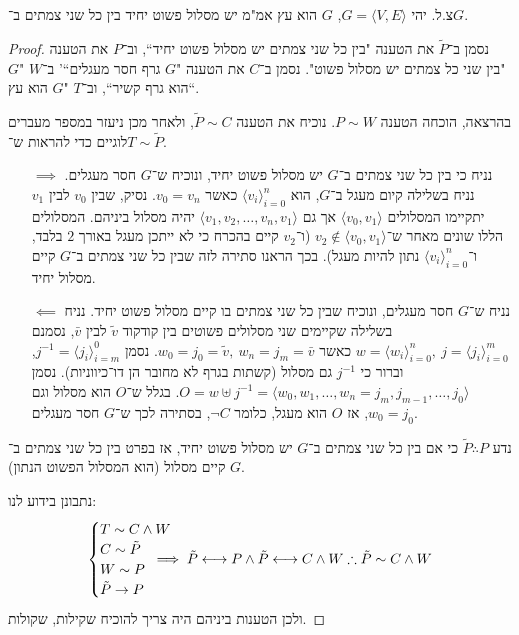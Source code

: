 \documentclass[]{article}
\newcommand\unquad {\!\!\!\!}
\newcommand\siff  {\longleftrightarrow}
\newcommand\ra    {\rangle}
\newcommand\la    {\langle}
\newcommand\tl    {\tilde}
\newcommand\op    {^{-1}}
\begin{document}
	\section{}
	צ.ל. יהי $G = \la V, E \ra$, $G$ הוא עץ אמ"מ יש מסלול פשוט יחיד בין כל שני צמתים ב־$G$. 
	\begin{proof}
		נסמן ב־$\tl P$ את הטענה "בין כל שני צמתים יש מסלול פשוט יחיד``, וב־$P$ את הטענה "בין שני כל צמתים יש מסלול פשוט". נסמן ב־$C$ את הטענה "$G$ גרף חסר מעגלים``' ב־$W$ "$G$ הוא גרף קשיר``, וב־$T$ "$G$ הוא עץ``. 
		
		בהרצאה, הוכחה הטענה $P \sim W$. נוכיח את הטענה $\tl P \sim C$, ולאחר מכן ניעזר במספר מעברים לוגיים כדי להראות ש־$T \sim \tl P$. 
		
		\begin{itemize}
			\item[$\implies$] נניח כי בין כל שני צמתים ב־$G$ יש מסלול פשוט יחיד, ונוכיח ש־$G$ חסר מעגלים. נניח בשלילה קיום מעגל ב־$G$, הוא $\la v_i \ra_{i = 0}^{n}$ כאשר $v_0 = v_n$. נסיק, שבין $v_0$ לבין $v_1$ יתקיימו המסלולים $\la v_0, v_1 \ra$ אך גם $\la v_1, v_2, \dots, v_n, v_1 \ra$ יהיה מסלול ביניהם. המסלולים הללו שונים מאחר ש־$v_2 \notin \la v_0, v_1 \ra$ (ו־$v_2$ קיים בהכרח כי לא ייתכן מעגל באורך $2$ בלבד, ו־$\la v_i \ra_{i = 0}^n$ נתון להיות מעגל). בכך הראנו סתירה לזה שבין כל שני צמתים ב־$G$ קיים מסלול יחיד. 
			\item[$\impliedby$] נניח ש־$G$ חסר מעגלים, ונוכיח שבין כל שני צמתים בו קיים מסלול פשוט יחיד. נניח בשלילה שקיימים שני מסלולים פשוטים בין קודקוד $\tl v$ לבין $\bar v$, נסמנם $w = \la w_i \ra_{i = 0}^n, \ j = \la j_i \ra_{i = 0}^m$ כאשר $w_0 = j_0 = \tl v, \ w_n = j_m = \bar v$. נסמן $j\op = \la j_i \ra_{i = m}^0$, וברור כי $j\op$ גם מסלול (קשתות בגרף לא מחובר הן דו־כיווניות). נסמן $O = w \uplus j\op = \la w_0, w_1, \dots, w_n = j_m, j_{m - 1}, \dots, j_0 \ra$. בגלל ש־$O$ הוא מסלול וגם $w_0 = j_0$, אז $O$ הוא מעגל, כלומר $\lnot C$, בסתירה לכך ש־$G$ חסר מעגלים. 
		\end{itemize}
		נדע $\tl P \therefore P$ כי אם בין כל שני צמתים ב־$G$ יש מסלול פשוט יחיד, אז בפרט בין כל שני צמתים ב־$G$ קיים מסלול (הוא המסלול הפשוט הנתון). 
		
		נתבונן בידוע לנו: 
		\[ \begin{cases}
			T \sim C \land W \\
			C \sim \tl P \\
			W \sim P \\
			\tl P \to P
		\end{cases} \unquad \unquad \unquad \unquad \implies
		\tl P \siff P \land \tl P \siff C \land W \therefore \tl P \sim C \land W \\
		\]
		ולכן הטענות ביניהם היה צריך להוכיח שקילות, שקולות. 
	\end{proof}
\end{document}
